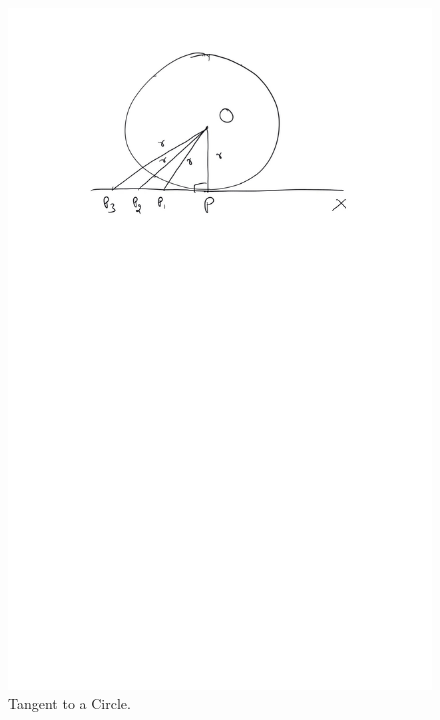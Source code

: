 \begin{figure}[!h]
	\begin{center}
		
		\includegraphics[width=\columnwidth]{./figs/ch4_tangent_def}
		\vspace*{-10cm}
	\end{center}
	\caption{Tangent to a Circle.}
	\label{ch4_tangent_def}	
\end{figure}
%
